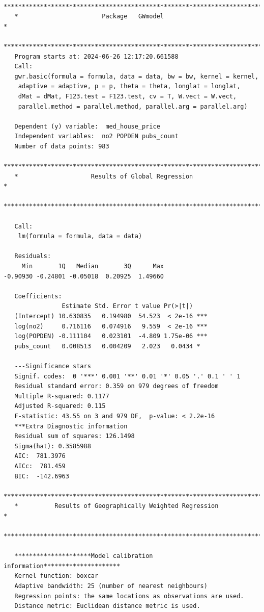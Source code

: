 \documentclass[
  letterpaper,
  DIV=11,
  numbers=noendperiod]{scrreprt}
\begin{document}
\begin{verbatim}
   ***********************************************************************
   *                       Package   GWmodel                             *
   ***********************************************************************
   Program starts at: 2024-06-26 12:17:20.661588 
   Call:
   gwr.basic(formula = formula, data = data, bw = bw, kernel = kernel, 
    adaptive = adaptive, p = p, theta = theta, longlat = longlat, 
    dMat = dMat, F123.test = F123.test, cv = T, W.vect = W.vect, 
    parallel.method = parallel.method, parallel.arg = parallel.arg)

   Dependent (y) variable:  med_house_price
   Independent variables:  no2 POPDEN pubs_count
   Number of data points: 983
   ***********************************************************************
   *                    Results of Global Regression                     *
   ***********************************************************************

   Call:
    lm(formula = formula, data = data)

   Residuals:
     Min       1Q   Median       3Q      Max 
-0.90930 -0.24801 -0.05018  0.20925  1.49660 

   Coefficients:
                Estimate Std. Error t value Pr(>|t|)    
   (Intercept) 10.630835   0.194980  54.523  < 2e-16 ***
   log(no2)     0.716116   0.074916   9.559  < 2e-16 ***
   log(POPDEN) -0.111104   0.023101  -4.809 1.75e-06 ***
   pubs_count   0.008513   0.004209   2.023   0.0434 *  

   ---Significance stars
   Signif. codes:  0 '***' 0.001 '**' 0.01 '*' 0.05 '.' 0.1 ' ' 1 
   Residual standard error: 0.359 on 979 degrees of freedom
   Multiple R-squared: 0.1177
   Adjusted R-squared: 0.115 
   F-statistic: 43.55 on 3 and 979 DF,  p-value: < 2.2e-16 
   ***Extra Diagnostic information
   Residual sum of squares: 126.1498
   Sigma(hat): 0.3585988
   AIC:  781.3976
   AICc:  781.459
   BIC:  -142.6963
   ***********************************************************************
   *          Results of Geographically Weighted Regression              *
   ***********************************************************************

   *********************Model calibration information*********************
   Kernel function: boxcar 
   Adaptive bandwidth: 25 (number of nearest neighbours)
   Regression points: the same locations as observations are used.
   Distance metric: Euclidean distance metric is used.


\end{verbatim}
\end{document}
